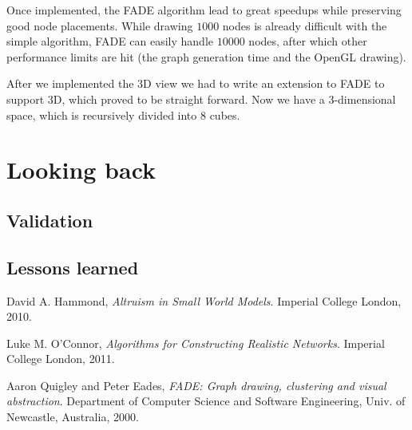 \documentclass[a4paper,11pt,titlepage]{article}
\let\stdsection\section         %
\renewcommand{\section}{\newpage\stdsection}
\begin{document}
Once implemented, the FADE algorithm lead to great speedups while
preserving good node placements. While drawing \(1000\) nodes is
already difficult with the simple algorithm, FADE can easily handle
\(10000\) nodes, after which other performance limits are hit (the
graph generation time and the OpenGL drawing).

After we implemented the 3D view we had to write an extension to FADE to support
3D, which proved to be straight forward. Now we have a 3-dimensional space,
which is recursively divided into $8$ cubes.



\section{Looking back}

\subsection{Validation}

\subsection{Lessons learned}

\begin{thebibliography}{9}

  David A. Hammond,
  \emph{Altruism in Small World Models}.
  Imperial College London,
  2010.

  Luke M. O'Connor,
  \emph{Algorithms for Constructing Realistic Networks}.
  Imperial College London,
  2011.

  Aaron Quigley and Peter Eades,
  \emph{FADE: Graph drawing, clustering and visual abstraction}.
  Department of Computer Science and Software Engineering,
  Univ. of  Newcastle, Australia, 2000.

\end{thebibliography}
\end{document}

